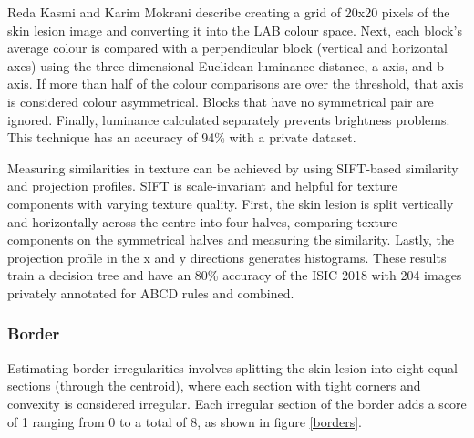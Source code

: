 Reda Kasmi and Karim Mokrani\cite{Kasmi2016} describe creating a grid of 20x20 pixels of the skin lesion image and converting it into the LAB colour space. Next, each block's average colour is compared with a perpendicular block (vertical and horizontal axes) using the three-dimensional Euclidean luminance distance, a-axis, and b-axis. If more than half of the colour comparisons are over the threshold, that axis is considered colour asymmetrical. Blocks that have no symmetrical pair are ignored. Finally, luminance calculated separately prevents brightness problems. This technique has an accuracy of 94\% with a private dataset.

Measuring similarities in texture can be achieved by using SIFT-based similarity and projection profiles\cite{Ali2020a}. SIFT is scale-invariant and helpful for texture components with varying texture quality. First, the skin lesion is split vertically and horizontally across the centre into four halves, comparing texture components on the symmetrical halves and measuring the similarity. Lastly, the projection profile in the x and y directions generates histograms. These results train a decision tree and have an 80\% accuracy of the ISIC 2018 with 204 images privately annotated for ABCD rules and combined.

\subsubsection{Border}
Estimating border irregularities involves splitting the skin lesion into eight equal sections (through the centroid), where each section with tight corners and convexity is considered irregular. Each irregular section of the border adds a score of 1 ranging from 0 to a total of 8, as shown in figure \ref{borders}.

